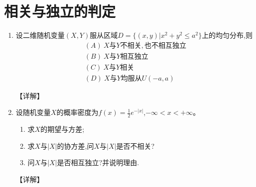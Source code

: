 \documentclass[12pt, a4paper, oneside, UTF8]{ctexbook}
\begin{document}
\section{相关与独立的判定}

\begin{enumerate}[label=\arabic*.,start=15]
    \item  设二维随机变量$(X,Y)$服从区域$D=\{(x,y)|x^2+y^2\leq a^2\}$上的均匀分布,则
    \begin{align*}
        (A)\ X与Y不相关,也不相互独立 \\
        (B)\ X与Y相互独立 \\
        (C)\ X与Y相关 \\
        (D)\ X与Y均服从U(-a,a)
    \end{align*}
    
    \begin{solution}
    【详解】
    \end{solution}
    
    \item  设随机变量$X$的概率密度为$f(x)=\frac{1}{2}e^{-|x|}$,$-\infty<x<+\infty$。
    \begin{enumerate}
        \item 求$X$的期望与方差;
        \item 求$X$与$|X|$的协方差,问$X$与$|X|$是否不相关?
        \item 问$X$与$|X|$是否相互独立?并说明理由.
    \end{enumerate}
    
    \begin{solution}
    【详解】
    \end{solution}
\end{enumerate}
\ifx\allfiles\undefined
\end{document}
